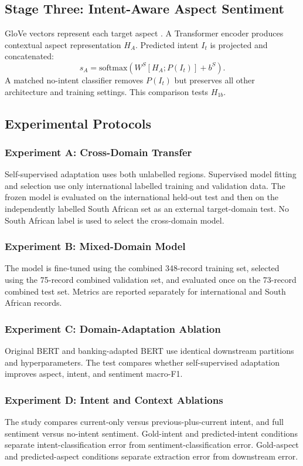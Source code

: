\documentclass[11pt,a4paper]{article}
\begin{document}
\subsection{Stage Three: Intent-Aware Aspect Sentiment}
GloVe vectors represent each target aspect \citep{pennington2014}. A Transformer encoder produces contextual aspect representation $H_A$. Predicted intent $I_t$ is projected and concatenated:
\begin{equation}
s_A=\mathrm{softmax}\left(W^S[H_A;P(I_t)]+b^S\right).
\end{equation}
A matched no-intent classifier removes $P(I_t)$ but preserves all other architecture and training settings. This comparison tests $H_{1b}$.

\subsection{Experimental Protocols}
\subsubsection{Experiment A: Cross-Domain Transfer}
Self-supervised adaptation uses both unlabelled regions. Supervised model fitting and selection use only international labelled training and validation data. The frozen model is evaluated on the international held-out test and then on the independently labelled South African set as an external target-domain test. No South African label is used to select the cross-domain model.

\subsubsection{Experiment B: Mixed-Domain Model}
The model is fine-tuned using the combined 348-record training set, selected using the 75-record combined validation set, and evaluated once on the 73-record combined test set. Metrics are reported separately for international and South African records.

\subsubsection{Experiment C: Domain-Adaptation Ablation}
Original BERT and banking-adapted BERT use identical downstream partitions and hyperparameters. The test compares whether self-supervised adaptation improves aspect, intent, and sentiment macro-F1.

\subsubsection{Experiment D: Intent and Context Ablations}
The study compares current-only versus previous-plus-current intent, and full sentiment versus no-intent sentiment. Gold-intent and predicted-intent conditions separate intent-classification error from sentiment-classification error. Gold-aspect and predicted-aspect conditions separate extraction error from downstream error.
\end{document}
